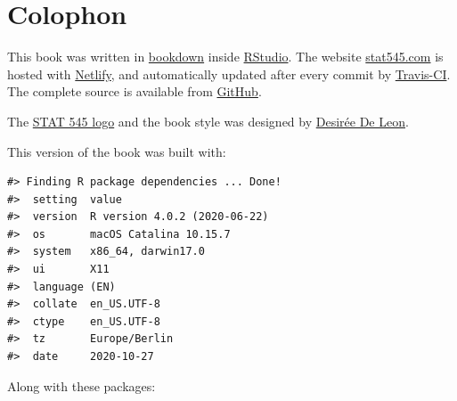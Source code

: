 \documentclass[
]{book}
\begin{document}
\hypertarget{colophon}{%
\section*{Colophon}\label{colophon}}

This book was written in \href{http://bookdown.org/}{bookdown} inside \href{http://www.rstudio.com/ide/}{RStudio}. The website \href{https://stat545.com}{stat545.com} is hosted with \href{https://www.netlify.com}{Netlify}, and automatically updated after every commit by \href{https://travis-ci.org}{Travis-CI}. The complete source is available from \href{https://github.com/rstudio-education/stat545}{GitHub}.

The \href{assets/stat545-logo.png}{STAT 545 logo} and the book style was designed by \href{https://desiree.rbind.io/}{Desirée De Leon}.

This version of the book was built with:

\begin{verbatim}
#> Finding R package dependencies ... Done!
#>  setting  value                       
#>  version  R version 4.0.2 (2020-06-22)
#>  os       macOS Catalina 10.15.7      
#>  system   x86_64, darwin17.0          
#>  ui       X11                         
#>  language (EN)                        
#>  collate  en_US.UTF-8                 
#>  ctype    en_US.UTF-8                 
#>  tz       Europe/Berlin               
#>  date     2020-10-27
\end{verbatim}

Along with these packages:
\end{document}
